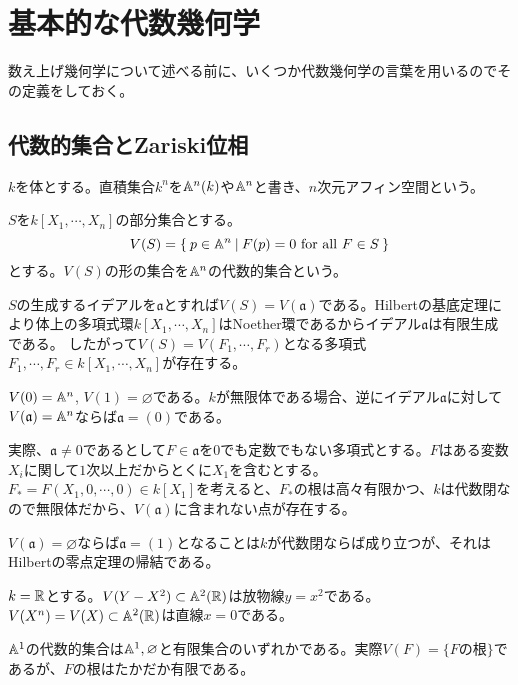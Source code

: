 \documentclass{ltjsreport}
\begin{document}
\section{基本的な代数幾何学}


数え上げ幾何学について述べる前に、いくつか代数幾何学の言葉を用いるのでその定義をしておく。

\subsection{代数的集合とZariski位相}
\begin{defin}
  $k$を体とする。直積集合$k^n$を$\mathbb{A}^n(k)$や$\mathbb{A}^n$と書き、$n$次元アフィン空間という。
\end{defin}

\begin{defin}
  $S$を$k[X_1,\cdots,X_n]$の部分集合とする。
  \[
  V(S)=\left\{\:p\in\mathbb{A}^n\:\middle|\:F(p)=0\text{ for all }F\in S\:\right\}  
  \]
  とする。$V(S)$の形の集合を$\mathbb{A}^n$の代数的集合という。
\end{defin}

$S$の生成するイデアルを$\mathfrak{a}$とすれば$V(S)=V(\mathfrak{a})$である。Hilbertの基底定理により体上の多項式環$k[X_1,\cdots,X_n]$はNoether環であるからイデアル$\mathfrak{a}$は有限生成である。
したがって$V(S)=V(F_1,\cdots,F_r)$となる多項式$F_1,\cdots,F_r\in k[X_1,\cdots,X_n]$が存在する。

\begin{eg}\label{rei1}
  $V(0)=\mathbb{A}^n$, $V(1)=\varnothing$である。$k$が無限体である場合、逆にイデアル$\mathfrak{a}$に対して$V(\mathfrak{a})=\mathbb{A}^n$ならば$\mathfrak{a}=(0)$である。
  
  実際、$\mathfrak{a}\neq 0$であるとして$F\in\mathfrak{a}$を$0$でも定数でもない多項式とする。$F$はある変数$X_i$に関して$1$次以上だからとくに$X_1$を含むとする。$F_*=F(X_1,0,\cdots,0)\in k[X_1]$を考えると、$F_*$の根は高々有限かつ、$k$は代数閉なので無限体だから、$V(\mathfrak{a})$に含まれない点が存在する。

  $V(\mathfrak{a})=\varnothing$ならば$\mathfrak{a}=(1)$となることは$k$が代数閉ならば成り立つが、それはHilbertの零点定理の帰結である。
\end{eg}

\begin{eg}
  $k=\mathbb{R}$とする。$V(Y-X^2)\subset\mathbb{A}^2(\mathbb{R})$は放物線$y=x^2$である。$V(X^n)=V(X)\subset \mathbb{A}^2(\mathbb{R})$は直線$x=0$である。
\end{eg}

\begin{eg}
  $\mathbb{A}^1$の代数的集合は$\mathbb{A}^1,\varnothing$と有限集合のいずれかである。実際$V(F)=\{\text{$F$の根}\}$であるが、$F$の根はたかだか有限である。
\end{eg}
\end{document}
